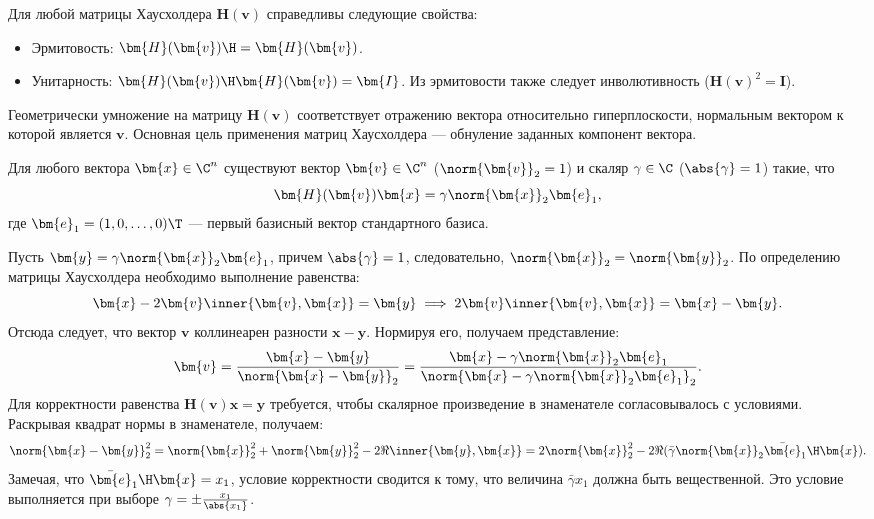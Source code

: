 \begin{tcblemma}
\label{lem:householder_prop}
    Для любой матрицы Хаусхолдера $\bm{H}(\bm{v})$ справедливы следующие свойства:
    \begin{itemize}
        \item Эрмитовость: $\bm{H}(\bm{v})\H = \bm{H}(\bm{v})$.
        \item Унитарность: $\bm{H}(\bm{v})\H \bm{H}(\bm{v}) = \bm{I}$. Из эрмитовости также следует инволютивность ($\bm{H}(\bm{v})^2 = \bm{I}$).
    \end{itemize}
\end{tcblemma}

Геометрически умножение на матрицу $\bm{H}(\bm{v})$ соответствует отражению вектора относительно гиперплоскости, нормальным вектором к которой является $\bm{v}$. Основная цель применения матриц Хаусхолдера — обнуление заданных компонент вектора.

\begin{tcbtheorem}
\label{thm:householder_map}
    Для любого вектора $\bm{x} \in \C^n$ существуют вектор $\bm{v} \in \C^n$ ($\norm{\bm{v}}_2 = 1$) и скаляр $\gamma \in \C$ ($\abs{\gamma} = 1$) такие, что
    \begin{equation}
        \bm{H}(\bm{v})\bm{x} = \gamma \norm{\bm{x}}_2 \bm{e}_1,
        \label{eq:householder_map}
    \end{equation}
    где $\bm{e}_1 = (1, 0, \dots, 0)\T$ — первый базисный вектор стандартного базиса.
\end{tcbtheorem}

\begin{tcbproof}
    Пусть $\bm{y} = \gamma \norm{\bm{x}}_2 \bm{e}_1$, причем $\abs{\gamma}=1$, следовательно, $\norm{\bm{x}}_2 = \norm{\bm{y}}_2$. По определению матрицы Хаусхолдера необходимо выполнение равенства:
    \[
        \bm{x} - 2\bm{v}\inner{\bm{v}, \bm{x}} = \bm{y} \implies 2\bm{v}\inner{\bm{v}, \bm{x}} = \bm{x} - \bm{y}.
    \]
    Отсюда следует, что вектор $\bm{v}$ коллинеарен разности $\bm{x} - \bm{y}$. Нормируя его, получаем представление:
    \begin{equation}
        \bm{v} = \frac{\bm{x} - \bm{y}}{\norm{\bm{x} - \bm{y}}_2} = \frac{\bm{x} - \gamma \norm{\bm{x}}_2 \bm{e}_1}{\norm{\bm{x} - \gamma \norm{\bm{x}}_2 \bm{e}_1}_2}.
        \label{eq:v_construction}
    \end{equation}
    Для корректности равенства $\bm{H}(\bm{v})\bm{x} = \bm{y}$ требуется, чтобы скалярное произведение в знаменателе согласовывалось с условиями. Раскрывая квадрат нормы в знаменателе, получаем:
    \[
        \norm{\bm{x} - \bm{y}}_2^2 = \norm{\bm{x}}_2^2 + \norm{\bm{y}}_2^2 - 2\Re\inner{\bm{y}, \bm{x}} = 2\norm{\bm{x}}_2^2 - 2\Re(\bar{\gamma}\norm{\bm{x}}_2 \bar{\bm{e}}_1\H \bm{x}).
    \]
    Замечая, что $\bar{\bm{e}}_1\H \bm{x} = x_1$, условие корректности сводится к тому, что величина $\bar{\gamma} x_1$ должна быть вещественной. Это условие выполняется при выборе $\gamma = \pm \frac{x_1}{\abs{x_1}}$.
\end{tcbproof}

